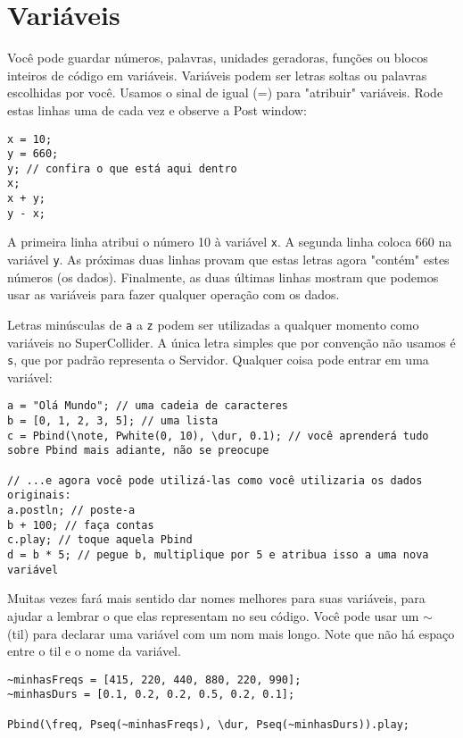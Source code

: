 \section{Variáveis}
\label{sec:variables}

Você pode guardar números, palavras, unidades geradoras, funções ou blocos inteiros de código em variáveis. Variáveis podem ser letras soltas ou palavras escolhidas por você. Usamos o sinal de igual (=) para "atribuir" variáveis. Rode estas linhas uma de cada vez e observe a Post window:

 
\begin{lstlisting}[style=SuperCollider-IDE, basicstyle=\scttfamily\footnotesize]
x = 10;
y = 660;
y; // confira o que está aqui dentro
x;
x + y;
y - x;
\end{lstlisting}
 

A primeira linha atribui o número 10 à variável \texttt{x}. A segunda linha coloca 660 na variável \texttt{y}. As próximas duas linhas provam que estas letras agora "contém" estes números (os dados). Finalmente, as duas últimas linhas mostram que podemos usar as variáveis para fazer qualquer operação com os dados.

Letras minúsculas de \texttt{a} a \texttt{z} podem ser utilizadas a qualquer momento como variáveis no SuperCollider. A única letra simples que por convenção não usamos é \texttt{s}, que por padrão representa o Servidor. Qualquer coisa pode entrar em uma variável:
 
\begin{lstlisting}[style=SuperCollider-IDE, basicstyle=\scttfamily\footnotesize]
a = "Olá Mundo"; // uma cadeia de caracteres
b = [0, 1, 2, 3, 5]; // uma lista
c = Pbind(\note, Pwhite(0, 10), \dur, 0.1); // você aprenderá tudo sobre Pbind mais adiante, não se preocupe

// ...e agora você pode utilizá-las como você utilizaria os dados originais:
a.postln; // poste-a
b + 100; // faça contas
c.play; // toque aquela Pbind
d = b * 5; // pegue b, multiplique por 5 e atribua isso a uma nova variável
\end{lstlisting}

Muitas vezes fará mais sentido dar nomes melhores para suas variáveis, para ajudar a lembrar o que elas representam no seu código. Você pode usar um $\sim$ (til) para declarar uma variável com um nom mais longo. Note que não há espaço entre o til e o nome da variável.

\begin{lstlisting}[style=SuperCollider-IDE, basicstyle=\scttfamily\footnotesize]
~minhasFreqs = [415, 220, 440, 880, 220, 990];
~minhasDurs = [0.1, 0.2, 0.2, 0.5, 0.2, 0.1];

Pbind(\freq, Pseq(~minhasFreqs), \dur, Pseq(~minhasDurs)).play;
\end{lstlisting}
 

